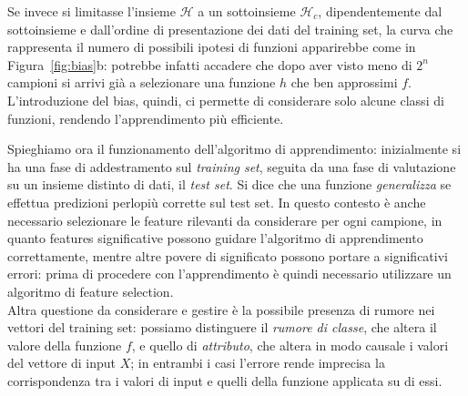 \documentclass[oneside, openany]{book}
\begin{document}
		Se invece si limitasse l'insieme $\mathcal{H}$ a un sottoinsieme $\mathcal{H}_c$, dipendentemente dal sottoinsieme e dall'ordine di presentazione dei dati del training set, la curva che rappresenta il numero di possibili ipotesi di funzioni apparirebbe come in Figura~\ref{fig:bias}b: potrebbe infatti accadere che dopo aver visto meno di $2^n$ campioni si arrivi già a selezionare una funzione $h$ che ben approssimi $f$. L'introduzione del bias, quindi, ci permette di considerare solo alcune classi di funzioni, rendendo l'apprendimento più efficiente.
		
		Spieghiamo ora il funzionamento dell'algoritmo di apprendimento: inizialmente si ha una fase di addestramento sul \textit{training set}, seguita da una fase di valutazione su un insieme distinto di dati, il \textit{test set}. Si dice che una funzione \textit{generalizza} se effettua predizioni perlopiù corrette sul test set.\newline
		In questo contesto è anche necessario selezionare le feature rilevanti da considerare per ogni campione, in quanto features significative possono guidare l'algoritmo di apprendimento correttamente, mentre altre povere di significato possono portare a significativi errori: prima di procedere con l'apprendimento è quindi necessario utilizzare un algoritmo di feature selection. \\
		Altra questione da considerare e gestire è la possibile presenza di rumore nei vettori del training set: possiamo distinguere il \textit{rumore di classe}, che altera il valore della funzione $f$, e quello di \textit{attributo}, che altera in modo causale i valori del vettore di input $X$; in entrambi i casi l'errore rende imprecisa la corrispondenza tra i valori di input e quelli della funzione applicata su di essi.\\
		
\end{document}
